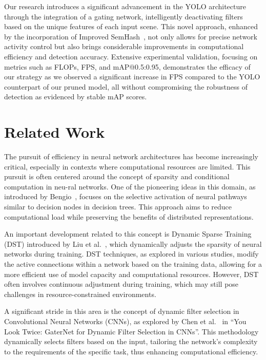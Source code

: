 \documentclass[runningheads]{llncs}
\begin{document}
Our research introduces a significant advancement in the YOLO architecture through the integration of a gating network, intelligently deactivating filters based on the unique features of each input scene. This novel approach, enhanced by the incorporation of Improved SemHash~\cite{bengio2013deep,chen2019you}, not only allows for precise network activity control but also brings considerable improvements in computational efficiency and detection accuracy. Extensive experimental validation, focusing on metrics such as FLOPs, FPS, and mAP@0.5:0.95, demonstrates the efficacy of our strategy as we observed a significant increase in FPS compared to the YOLO counterpart of our pruned model, all without compromising the robustness of detection as evidenced by stable mAP scores.
%
\section{Related Work}
The pursuit of efficiency in neural network architectures has become increasingly critical, especially in contexts where computational resources are limited. This pursuit is often centered around the concept of sparsity and conditional computation in neu-ral networks. One of the pioneering ideas in this domain, as introduced by Bengio~\cite{bengio2013deep}, focuses on the selective activation of neural pathways similar to decision nodes in decision trees. This approach aims to reduce computational load while preserving the benefits of distributed representations.

An important development related to this concept is Dynamic Sparse Training (DST) introduced by Liu et al.~\cite{liu2020dynamic}, which dynamically adjusts the sparsity of neural networks during training. DST techniques, as explored in various studies, modify the active connections within a network based on the training data, allowing for a more efficient use of model capacity and computational resources. However, DST often involves continuous adjustment during training, which may still pose challenges in resource-constrained environments.

A significant stride in this area is the concept of dynamic filter selection in Convolutional Neural Networks (CNNs), as explored by Chen et al.~\cite{chen2019you} in “You Look Twice: GaterNet for Dynamic Filter Selection in CNNs”. This methodology dynamically selects filters based on the input, tailoring the network's complexity to the requirements of the specific task, thus enhancing computational efficiency.
\end{document}
